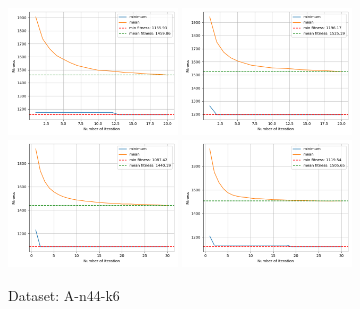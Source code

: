 \documentclass[12pt]{report}
\begin{document}
\begin{figure}[!ht]
	\centering
	\includegraphics[width=0.4\textwidth]{../CVRP/plots/A-n44-k6-20-20.png}
	\includegraphics[width=0.4\textwidth]{../CVRP/plots/A-n44-k6-20-30.png}
	\includegraphics[width=0.4\textwidth]{../CVRP/plots/A-n44-k6-30-20.png}
	\includegraphics[width=0.4\textwidth]{../CVRP/plots/A-n44-k6-30-30.png}
	\caption{Dataset: A-n44-k6}
	\label{fig:A-n44-k6}
\end{figure}

\end{document}
